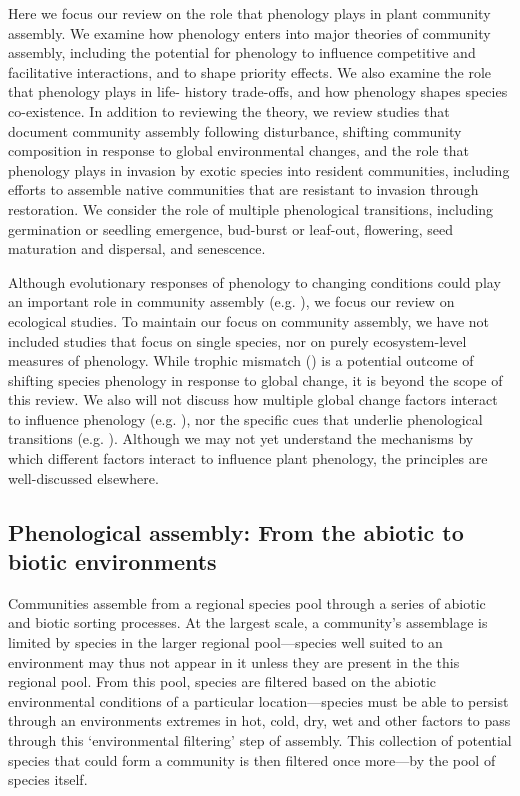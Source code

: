 \documentclass[11pt]{article}
\begin{document}
Here we focus our review on the role that phenology plays in plant community assembly. We examine how phenology enters into major theories of community assembly, including the potential for phenology to influence competitive and facilitative interactions, and to shape priority effects. We also examine the role that phenology plays in life- history trade-offs, and how phenology shapes species co-existence. In addition to reviewing the theory, we review studies that document community assembly following disturbance, shifting community composition in response to global environmental changes, and the role that phenology plays in invasion by exotic species into resident communities, including efforts to assemble native communities that are resistant to invasion through restoration. We consider the role of multiple phenological transitions, including germination or seedling emergence, bud-burst or leaf-out, flowering, seed maturation and dispersal, and senescence.

Although evolutionary responses of phenology to changing conditions could play an important role in community assembly (e.g. \citet{cavender2019diversification}), we focus our review on ecological studies. To maintain our focus on community assembly, we have not included studies that focus on single species, nor on purely ecosystem-level measures of phenology. While trophic mismatch (\citet{kharouba2018global}) is a potential outcome of shifting species phenology in response to global change, it is beyond the scope of this review. We also will not discuss how multiple global change factors interact to influence phenology (e.g. \citet{zhou2023climate}), nor the specific cues that underlie phenological transitions (e.g. \citet{chuine2017process}). Although we may not yet understand the mechanisms by which different factors interact to influence plant phenology, the principles are well-discussed elsewhere.

\subsection*{Phenological assembly: From the abiotic to biotic environments}
Communities assemble from a regional species pool through a series of abiotic and biotic sorting processes. At the largest scale, a community's assemblage is limited by species in the larger regional pool---species well suited to an environment may thus not appear in it unless they are present in the this regional pool. From this pool, species are filtered based on the abiotic environmental conditions of a particular location---species must be able to persist through an environments extremes in hot, cold, dry, wet and other factors to pass through this `environmental filtering' step of assembly. This collection of potential species that could form a community is then filtered once more---by the pool of species itself. 
\end{document}
